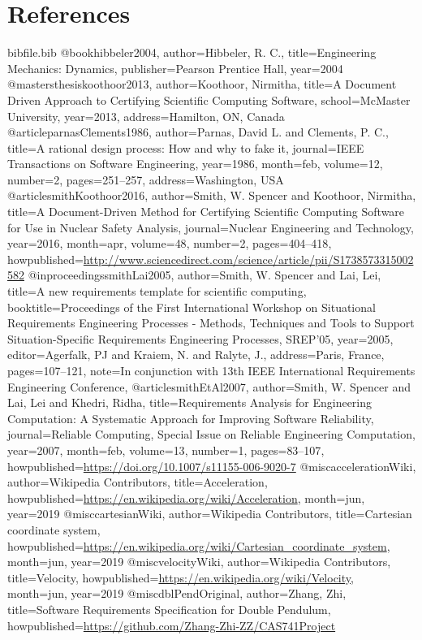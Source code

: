 \documentclass[12pt]{article}
\begin{document}
\section{References}
\label{Sec:References}
\begin{filecontents*}{bibfile.bib}
@book{hibbeler2004,
author={Hibbeler, R. C.},
title={Engineering Mechanics: Dynamics},
publisher={Pearson Prentice Hall},
year={2004}}
@mastersthesis{koothoor2013,
author={Koothoor, Nirmitha},
title={A Document Driven Approach to Certifying Scientific Computing Software},
school={McMaster University},
year={2013},
address={Hamilton, ON, Canada}}
@article{parnasClements1986,
author={Parnas, David L. and Clements, P. C.},
title={A rational design process: How and why to fake it},
journal={IEEE Transactions on Software Engineering},
year={1986},
month=feb,
volume={12},
number={2},
pages={251--257},
address={Washington, USA}}
@article{smithKoothoor2016,
author={Smith, W. Spencer and Koothoor, Nirmitha},
title={A Document-Driven Method for Certifying Scientific Computing Software for Use in Nuclear Safety Analysis},
journal={Nuclear Engineering and Technology},
year={2016},
month=apr,
volume={48},
number={2},
pages={404--418},
howpublished={\url{http://www.sciencedirect.com/science/article/pii/S1738573315002582}}}
@inproceedings{smithLai2005,
author={Smith, W. Spencer and Lai, Lei},
title={A new requirements template for scientific computing},
booktitle={Proceedings of the First International Workshop on Situational Requirements Engineering Processes - Methods, Techniques and Tools to Support Situation-Specific Requirements Engineering Processes, SREP'05},
year={2005},
editor={Agerfalk, PJ and Kraiem, N. and Ralyte, J.},
address={Paris, France},
pages={107--121},
note={In conjunction with 13th IEEE International Requirements Engineering Conference,}}
@article{smithEtAl2007,
author={Smith, W. Spencer and Lai, Lei and Khedri, Ridha},
title={Requirements Analysis for Engineering Computation: A Systematic Approach for Improving Software Reliability},
journal={Reliable Computing, Special Issue on Reliable Engineering Computation},
year={2007},
month=feb,
volume={13},
number={1},
pages={83--107},
howpublished={\url{https://doi.org/10.1007/s11155-006-9020-7}}}
@misc{accelerationWiki,
author={Wikipedia Contributors},
title={Acceleration},
howpublished={\url{https://en.wikipedia.org/wiki/Acceleration}},
month=jun,
year={2019}}
@misc{cartesianWiki,
author={Wikipedia Contributors},
title={Cartesian coordinate system},
howpublished={\url{https://en.wikipedia.org/wiki/Cartesian\_coordinate\_system}},
month=jun,
year={2019}}
@misc{velocityWiki,
author={Wikipedia Contributors},
title={Velocity},
howpublished={\url{https://en.wikipedia.org/wiki/Velocity}},
month=jun,
year={2019}}
@misc{dblPendOriginal,
author={Zhang, Zhi},
title={Software Requirements Specification for Double Pendulum},
howpublished={\url{https://github.com/Zhang-Zhi-ZZ/CAS741Project}}}
\end{filecontents*}
\nocite{*}
\printbibliography[heading=none]
\end{document}
